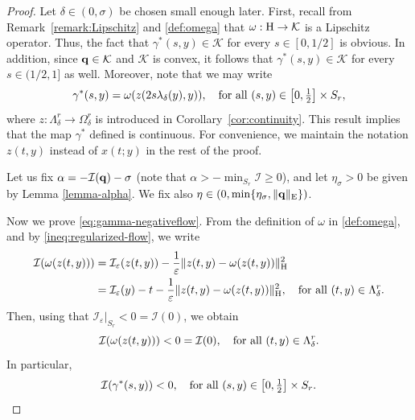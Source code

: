 \documentclass{article}
\newcommand{\boK}{\mathcal{K}}
\newcommand{\boI}{\mathcal{I}}
\newcommand{\Hilb}{{\textnormal H}}
\newcommand{\Ebanach}{{\textnormal E}}
\newcommand{\minq}{{\bf q}}
\theoremstyle{definition}
\begin{document}
\begin{proof}
Let $\delta\in (0,\sigma)$ be chosen small enough later. First, recall from Remark~\ref{remark:Lipschitz} and \eqref{def:omega} that $\omega:\Hilb\to\boK$ is a Lipschitz operator. Thus, the fact that $\gamma^*(s,y)\in\boK$ for every $s\in [0,1/2]$ is obvious. In addition, since $\minq\in\boK$ and $\boK$ is convex, it follows that $\gamma^*(s,y)\in\boK$ for every $s\in (1/2,1]$ as well. Moreover, note that we may write 
\begin{equation}
    \gamma^*(s,y)=\omega(z(2s\lambda_\delta(y),y)),\quad\hbox{for all }(s,y)\in\left[0,\tfrac{1}{2}\right]\times S_r,
\end{equation}where $z:\Lambda_\delta^r\to\Omega_\delta^r$ is introduced in Corollary~\ref{cor:continuity}. This result  implies that the map $\gamma^*$ defined is continuous. For convenience, we maintain the notation $z(t,y)$ instead of $x(t;y)$ in the rest of the proof.



Let us fix $\alpha=-\boI(\minq)-\sigma$ (note that $\alpha>-\min_{S_r}\boI\geq0$), and let $\eta_\sigma>0$ be given by Lemma \ref{lemma-alpha}. We fix also $\eta\in(0,\min\{\eta_\sigma,\|\minq\|_\Ebanach\})$.

Now we prove \eqref{eq:gamma-negativeflow}. From the definition of $\omega$ in \eqref{def:omega}, and by \eqref{ineq:regularized-flow}, we write
\begin{align*}
    \boI(\omega(z(t,y)))&=\boI_\varepsilon(z(t,y))-\dfrac{1}{\varepsilon}\|z(t,y)-\omega(z(t,y))\|_\Hilb^2
    \\
    &=\boI_\varepsilon(y)-t-\dfrac{1}{\varepsilon}\|z(t,y)-\omega(z(t,y))\|_\Hilb^2,\quad\hbox{for all }(t,y)\in\Lambda_\delta^r.
\end{align*}
Then, using that $\boI_\varepsilon|_{S_r}<0=\boI(0)$, we obtain
\begin{equation}\label{ineq:omega-flow}
\boI(\omega(z(t,y)))<0=\boI(0),\quad\hbox{for all }(t,y)\in\Lambda_\delta^r.
\end{equation}
In particular,
\begin{equation} 
    \boI(\gamma^*(s,y))<0, \quad\hbox{for all }(s,y)\in\left[0,\tfrac{1}{2}\right]\times S_r.
\end{equation}


\end{proof}
\end{document}
